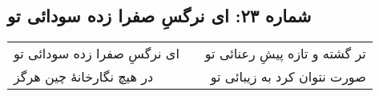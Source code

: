 \begin{center}
\section*{شماره ۲۳: ای نرگسِ صفرا زده سودائی تو}
\label{sec:023}
\begin{longtable}{l p{0.5cm} r}
ای نرگسِ صفرا زده سودائی تو
&&
تر گشته و تازه پیشِ رعنائی تو
\\
در هیچ نگارخانهٔ چین هرگز
&&
صورت نتوان کرد به زیبائی تو
\\
\end{longtable}
\end{center}
